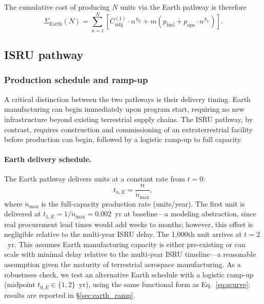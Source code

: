 \documentclass[preprint,12pt]{elsarticle}
\begin{document}
The cumulative cost of producing $N$ units via the Earth pathway is therefore
\begin{equation}
  \Sigma_{\mathrm{Earth}}(N) = \sum_{n=1}^{N} \left[ C_{\mathrm{mfg}}^{(1)} \cdot n^{\,b_E} + m \left( p_{\mathrm{fuel}} + p_{\mathrm{ops}} \cdot n^{\,b_L} \right) \right].
  \label{eq:earth_cum}
\end{equation}

\subsection{ISRU pathway}

\subsubsection{Production schedule and ramp-up}

A critical distinction between the two pathways is their delivery timing. Earth manufacturing can begin immediately upon program start, requiring no new infrastructure beyond existing terrestrial supply chains. The ISRU pathway, by contrast, requires construction and commissioning of an extraterrestrial facility before production can begin, followed by a logistic ramp-up to full capacity.

\paragraph{Earth delivery schedule.} The Earth pathway delivers units at a constant rate from $t = 0$:
\begin{equation}
  t_{n,E} = \frac{n}{\dot{n}_{\max}},
  \label{eq:earth_schedule}
\end{equation}
where $\dot{n}_{\max}$ is the full-capacity production rate (units/year). The first unit is delivered at $t_{1,E} = 1/\dot{n}_{\max} = 0.002$~yr at baseline---a modeling abstraction, since real procurement lead times would add weeks to months; however, this offset is negligible relative to the multi-year ISRU delay. The 1{,}000th unit arrives at $t = 2$~yr. This assumes Earth manufacturing capacity is either pre-existing or can scale with minimal delay relative to the multi-year ISRU timeline---a reasonable assumption given the maturity of terrestrial aerospace manufacturing. As a robustness check, we test an alternative Earth schedule with a logistic ramp-up (midpoint $t_{0,E} \in \{1, 2\}$~yr), using the same functional form as Eq.~\ref{eq:scurve}; results are reported in \S\ref{sec:earth_ramp}.
\end{document}
